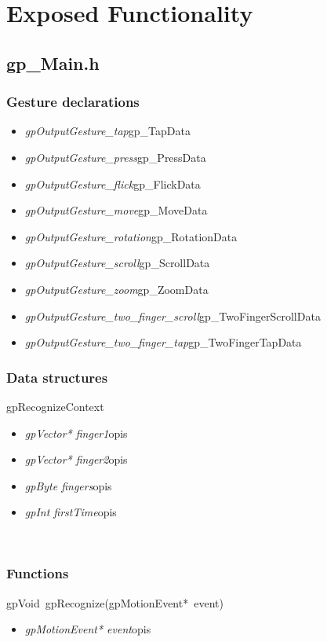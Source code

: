 \section{Exposed Functionality}
\subsection{gp_Main.h}
\subsubsection{Gesture declarations}
\begin{itemize}
\item \textit{gpOutputGesture_tap}\quad gp_TapData
\item \textit{gpOutputGesture_press}\quad gp_PressData
\item \textit{gpOutputGesture_flick}\quad gp_FlickData
\item \textit{gpOutputGesture_move}\quad gp_MoveData
\item \textit{gpOutputGesture_rotation}\quad gp_RotationData
\item \textit{gpOutputGesture_scroll}\quad gp_ScrollData
\item \textit{gpOutputGesture_zoom}\quad gp_ZoomData
\item \textit{gpOutputGesture_two_finger_scroll}\quad gp_TwoFingerScrollData
\item \textit{gpOutputGesture_two_finger_tap}\quad gp_TwoFingerTapData
\end{itemize}
\subsubsection{Data structures}
\textsf{gpRecognizeContext}
	\begin{itemize}
		\item \textit{gpVector* finger1}\quad opis
		\item \textit{gpVector* finger2}\quad opis
		\item \textit{gpByte fingers}\quad opis
		\item \textit{gpInt firstTime}\quad opis
	\end{itemize}
\ \\
\subsubsection{Functions}
\mbox{\textsf{gpVoid gpRecognize(gpMotionEvent* event)}}
	\begin{itemize}
		\item \textit{gpMotionEvent* event}\quad opis
	\end{itemize}

